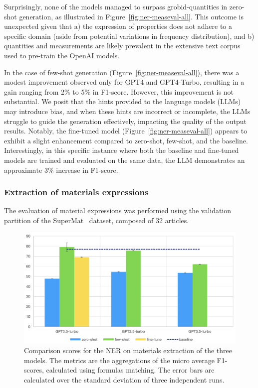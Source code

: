 \documentclass[a4paper]{article}
\begin{document}
Surprisingly, none of the models managed to surpass grobid-quantities in zero-shot generation, as illustrated in Figure~\ref{fig:ner-measeval-all}. This outcome is unexpected given that a) the expression of properties does not adhere to a specific domain (aside from potential variations in frequency distribution), and b) quantities and measurements are likely prevalent in the extensive text corpus used to pre-train the OpenAI models.

In the case of few-shot generation (Figure~\ref{fig:ner-measeval-all}), there was a modest improvement observed only for GPT4 and GPT4-Turbo, resulting in a gain ranging from 2\% to 5\% in F1-score. However, this improvement is not substantial. We posit that the hints provided to the language models (LLMs) may introduce bias, and when these hints are incorrect or incomplete, the LLMs struggle to guide the generation effectively, impacting the quality of the output results.
Notably, the fine-tuned model (Figure~\ref{fig:ner-measeval-all}) appears to exhibit a slight enhancement compared to zero-shot, few-shot, and the baseline. Interestingly, in this specific instance where both the baseline and fine-tuned models are trained and evaluated on the same data, the LLM demonstrates an approximate 3\% increase in F1-score.

\subsubsection{Extraction of materials expressions}
\label{sec:results-ner-materials}
The evaluation of material expressions was performed using the validation partition of the SuperMat~\cite{lfoppiano2021supermat} dataset, composed of 32 articles.

\begin{figure}[htbp]
  \centering
  \includegraphics[width=1\textwidth]{figures/ner-supermat-all.png} 
  \caption{Comparison scores for the NER on materials extraction of the three models. The metrics are the aggregations of the micro average F1-scores, calculated using formulas matching. The error bars are calculated over the standard deviation of three independent runs.}
  \label{fig:ner-materials-all}
\end{figure}
\end{document}
